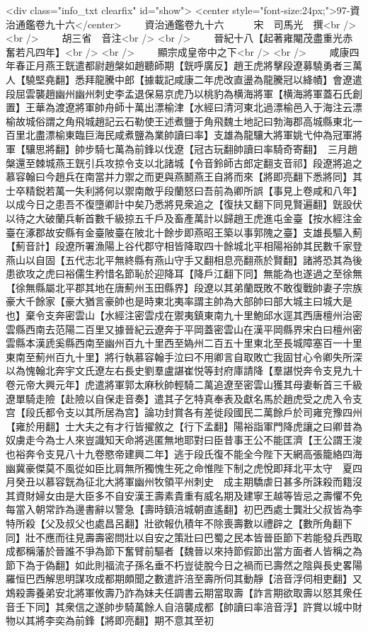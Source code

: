<div class="info_txt clearfix" id="show">
<center style="font-size:24px;">97-資治通鑑卷九十六</center>
  　　資治通鑑卷九十六　　　宋　司馬光　撰<br />
<br />
　　胡三省　音注<br />
<br />
　　晉紀十八【起著雍閹茂盡重光赤奮若凡四年】<br />
<br />
　　顯宗成皇帝中之下<br />
<br />
　　咸康四年春正月燕王皝遣都尉趙槃如趙聽師期【皝呼廣反】趙王虎將擊段遼募驍勇者三萬人【驍堅堯翻】悉拜龍騰中郎【據載記咸康二年虎改直盪為龍騰冠以絳幘】會遼遣段屈雲襲趙幽州幽州刺史李孟退保易京虎乃以桃豹為横海將軍【横海將軍蓋石氏創置】王華為渡遼將軍帥舟師十萬出漂榆津【水經曰清河東北過漂榆邑入于海注云漂榆故城俗謂之角飛城趙記云石勒使王述煮鹽于角飛魏土地記曰勃海郡高城縣東北一百里北盡漂榆東臨巨海民咸煮鹽為業帥讀曰率】支雄為龍驤大將軍姚弋仲為冠軍將軍【驤思將翻】帥步騎七萬為前鋒以伐遼【冠古玩翻帥讀曰率騎奇寄翻】　三月趙槃還至棘城燕王皝引兵攻掠令支以北諸城【令音鈴師古郎定翻支音祁】段遼將追之慕容翰曰今趙兵在南當并力禦之而更與燕鬭燕王自將而來【將即亮翻下悉將同】其士卒精鋭若萬一失利將何以禦南敵乎段蘭怒曰吾前為卿所誤【事見上卷咸和八年】以成今日之患吾不復墮卿計中矣乃悉將見衆追之【復扶又翻下同見賢遍翻】皝設伏以待之大破蘭兵斬首數千級掠五千戶及畜產萬計以歸趙王虎進屯金臺【按水經注金臺在涿郡故安縣有金臺陂臺在陂北十餘步即燕昭王築以事郭隗之臺】支雄長驅入薊【薊音計】段遼所署漁陽上谷代郡守相皆降取四十餘城北平相陽裕帥其民數千家登燕山以自固【五代志北平無終縣有燕山守手又翻相息亮翻燕於賢翻】諸將恐其為後患欲攻之虎曰裕儒生矜惜名節恥於迎降耳【降戶江翻下同】無能為也遂過之至徐無【徐無縣屬北平郡其地在唐薊州玉田縣界】段遼以其弟蘭既敗不敢復戰帥妻子宗族豪大千餘家【豪大猶言豪帥也是時東北夷率謂主帥為大部帥曰部大城主曰城大是也】棄令支奔密雲山【水經注密雲戍在禦夷鎮東南九十里鮑邱水逕其西唐檀州治密雲縣西南去范陽二百里又據晉紀云遼奔于平岡蓋密雲山在漢平岡縣界宋白曰檀州密雲縣本漢虒奚縣西南至幽州百九十里西至媯州二百五十里東北至長城障塞百一十里東南至薊州百九十里】將行執慕容翰手泣曰不用卿言自取敗亡我固甘心令卿失所深以為愧翰北奔宇文氏遼左右長史劉羣盧諶崔悦等封府庫請降【羣諶悦奔令支見九十卷元帝大興元年】虎遣將軍郭太麻秋帥輕騎二萬追遼至密雲山獲其母妻斬首三千級遼單騎走險【赴險以自保走音奏】遣其子乞特真奉表及獻名馬於趙虎受之虎入令支宫【段氏都令支以其所居為宫】論功封賞各有差徙段國民二萬餘戶於司雍兖豫四州【雍於用翻】士大夫之有才行皆擢敘之【行下孟翻】陽裕詣軍門降虎讓之曰卿昔為奴虜走今為士人來豈識知天命將逃匿無地耶對曰臣昔事王公不能匡濟【王公謂王浚也裕奔令支見八十九卷愍帝建興二年】逃于段氏復不能全今陛下天網高張籠絡四海幽冀豪傑莫不風從如臣比肩無所獨愧生死之命惟陛下制之虎悅即拜北平太守　夏四月癸丑以慕容皝為征北大將軍幽州牧領平州刺史　成主期驕虐日甚多所誅殺而籍沒其資財婦女由是大臣多不自安漢王壽素貴重有威名期及建寧王越等皆忌之壽懼不免每當入朝常詐為邊書辭以警急【壽時鎮涪城朝直遙翻】初巴西處士龔壯父叔皆為李特所殺【父及叔父也處昌呂翻】壯欲報仇積年不除喪壽數以禮辟之【數所角翻下同】壯不應而往見壽壽密問壯以自安之策壯曰巴蜀之民本皆晉臣節下若能發兵西取成都稱藩於晉誰不爭為節下奮臂前驅者【魏晉以來持節假節出當方面者人皆稱之為節下為于偽翻】如此則福流子孫名垂不朽豈徒脫今日之禍而已壽然之陰與長史畧陽羅恒巴西解思明謀攻成都期頗聞之數遣許涪至壽所伺其動靜【涪音浮伺相吏翻】又鴆殺壽養弟安北將軍攸壽乃詐為妹夫任調書云期當取壽【詐言期欲取壽以怒其衆任音壬下同】其衆信之遂帥步騎萬餘人自涪襲成都【帥讀曰率涪音浮】許賞以城中財物以其將李奕為前鋒【將即亮翻】期不意其至初